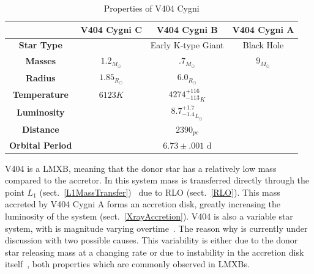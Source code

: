 \documentclass[12pt, a4paper]{article}
\begin{document}
        \begin{table} [H]
            \begin{center} 
                \begin{tabular}{||c || c | c | c ||} 
                 \hline
                 &\textbf{V404 Cygni C} & \textbf{V404 Cygni B} & \textbf{V404 Cygni A} \\ 
                 \hline\hline
                 \textbf{Star Type} & & Early K-type Giant & Black Hole \\ 
                 \hline
                 \textbf{Masses}& $1.2_{M_\odot}$ \parencite{burdge_2024}& $.7_{M_\odot}$ \parencite{Bernardini_2016} & $9_{M_\odot}$ \parencite{Shahbaz_1994} \parencite{Ziółkowski_2018} \\
                 \hline
                 \textbf{Radius} & $1.85_{R_\odot}$ \parencite{burdge_2024}& $6.0_{R_\odot}$ \parencite{Shahbaz_1994} &  \\
                 \hline
                 \textbf{Temperature} & $6123K$ \parencite{burdge_2024} & ${4274^{+116}_{-113}}_K$ \parencite{Ziółkowski_2018} & \\
                 \hline
                 \textbf{Luminosity} & & ${8.7^{+1.7}_{-1.4}}_{L_\odot}$ \parencite{Ziółkowski_2018} &  \\ 
                 \hline
                 \textbf{Distance} & \multicolumn{3}{c||}{$2390_{pc}$ \parencite{Bernardini_2016}} \\
                 \hline
                 \textbf{Orbital Period} & \multicolumn{3}{c||}{$6.73 \pm .001$ d  \parencite{Ziółkowski_2018}}\\
                 \hline  
            \end{tabular}
            \caption{Properties of V404 Cygni} 
            \label{V404Data} 
            \end{center}
        \end{table}

        V404 is a LMXB, meaning that the donor star has a relatively low mass compared to the accretor. In this system mass is transferred directly through the point $L_1$ (sect.~\ref{L1MassTransfer})~\parencite{Bartolomeo_2023} due to RLO (sect.~\ref{RLO}). This mass accreted by V404 Cygni A forms an accretion disk, greatly increasing the luminosity of the system (sect.~\ref{XrayAccretion}). V404 is also a variable star system, with is magnitude varying overtime~\parencite{Bernardini_2016}. The reason why is currently under discussion with two possible causes. This variability is either due to the donor star releasing mass at a changing rate \parencite{TanakaLewin_1995} or due to instability in the accretion disk itself~\parencite{Lasota_2001}, both properties which are commonly observed in LMXBs. 
\end{document}
